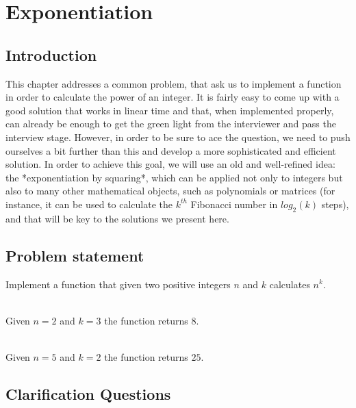 %

\chapter{Exponentiation}
\label{ch:exponentiation}
\section*{Introduction}
This chapter addresses a common problem, that ask us to implement a function in order to calculate the power of an integer.  
It is fairly easy to come up with a good solution that works in linear time and that, 
when implemented properly, can already be enough to get the green light from the interviewer and pass the interview stage.
However, in order to be sure to ace the question, we need to push ourselves a bit further than this and develop a more sophisticated and efficient solution.
In order to achieve this goal, we will use an old and well-refined idea: the *exponentiation by squaring*, which can be
applied not only to integers but also to many other mathematical objects, such as polynomials or
matrices (for instance, it can be used to calculate the $k^{th}$ Fibonacci number in $log_2(k)$ steps), and that will be key to the solutions we present here. 

\section{Problem statement}

\begin{exercise}
Implement a function that given two positive integers $n$ and $k$ calculates $n^k$.

    \begin{example}
        \hfill \\
        Given $n=2$ and $k=3$ the function returns $8$.
    \end{example}

    \begin{example}
        \hfill \\
        Given $n=5$ and $k=2$ the function returns $25$.
    \end{example}

\end{exercise}

\section{Clarification Questions}

